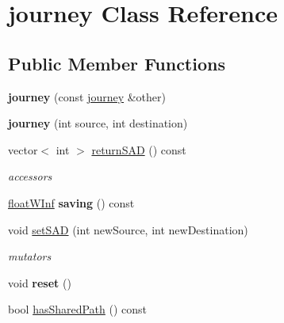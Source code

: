 \hypertarget{classjourney}{
\section{journey Class Reference}
\label{classjourney}
}
\subsection*{Public Member Functions}
\begin{DoxyCompactItemize}
\item 
\hypertarget{classjourney_a6a2c1b97147192ea81da85d2cb2e53d9}{
{\bfseries journey} (const \hyperlink{classjourney}{journey} \&other)}
\label{classjourney_a6a2c1b97147192ea81da85d2cb2e53d9}

\item 
\hypertarget{classjourney_aabe0fc5440867124eb0e482625cd1925}{
{\bfseries journey} (int source, int destination)}
\label{classjourney_aabe0fc5440867124eb0e482625cd1925}

\item 
\hypertarget{classjourney_a6652f5d294bdf19cdfc3efb5b7570059}{
vector$<$ int $>$ \hyperlink{classjourney_a6652f5d294bdf19cdfc3efb5b7570059}{returnSAD} () const }
\label{classjourney_a6652f5d294bdf19cdfc3efb5b7570059}

\begin{DoxyCompactList}\small\item\em accessors \end{DoxyCompactList}\item 
\hypertarget{classjourney_aabed52843b2fc6843b002d82e514018c}{
\hyperlink{classfloatWInf}{floatWInf} {\bfseries saving} () const }
\label{classjourney_aabed52843b2fc6843b002d82e514018c}

\item 
\hypertarget{classjourney_a4b7d5686653d7ca921adfee9368783c4}{
void \hyperlink{classjourney_a4b7d5686653d7ca921adfee9368783c4}{setSAD} (int newSource, int newDestination)}
\label{classjourney_a4b7d5686653d7ca921adfee9368783c4}

\begin{DoxyCompactList}\small\item\em mutators \end{DoxyCompactList}\item 
\hypertarget{classjourney_add44c52be8c03d8e8393fa214df3565d}{
void {\bfseries reset} ()}
\label{classjourney_add44c52be8c03d8e8393fa214df3565d}

\item 
\hypertarget{classjourney_acd7ce3f53d66b61885494429a34f735f}{
bool \hyperlink{classjourney_acd7ce3f53d66b61885494429a34f735f}{hasSharedPath} () const }
\label{classjourney_acd7ce3f53d66b61885494429a34f735f}


\end{DoxyCompactItemize}
